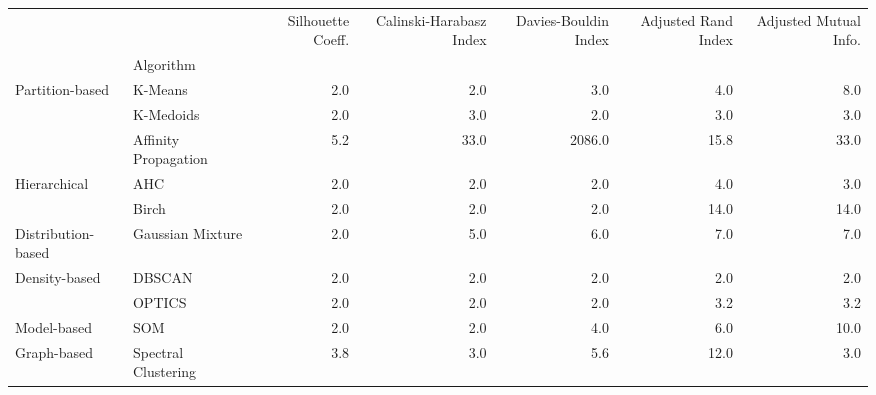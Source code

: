 \begin{tabular}{llrrrrr}
 &  & Silhouette Coeff. & Calinski-Harabasz Index & Davies-Bouldin Index & Adjusted Rand Index & Adjusted Mutual Info. \\
 & Algorithm &  &  &  &  &  \\
\multirow[c]{3}{*}{Partition-based} & K-Means & 2.0 & 2.0 & 3.0 & 4.0 & 8.0 \\
 & K-Medoids & 2.0 & 3.0 & 2.0 & 3.0 & 3.0 \\
 & Affinity Propagation & 5.2 & 33.0 & 2086.0 & 15.8 & 33.0 \\
\multirow[c]{2}{*}{Hierarchical} & AHC & 2.0 & 2.0 & 2.0 & 4.0 & 3.0 \\
 & Birch & 2.0 & 2.0 & 2.0 & 14.0 & 14.0 \\
Distribution-based & Gaussian Mixture & 2.0 & 5.0 & 6.0 & 7.0 & 7.0 \\
\multirow[c]{2}{*}{Density-based} & DBSCAN & 2.0 & 2.0 & 2.0 & 2.0 & 2.0 \\
 & OPTICS & 2.0 & 2.0 & 2.0 & 3.2 & 3.2 \\
Model-based & SOM & 2.0 & 2.0 & 4.0 & 6.0 & 10.0 \\
Graph-based & Spectral Clustering & 3.8 & 3.0 & 5.6 & 12.0 & 3.0 \\
\end{tabular}
